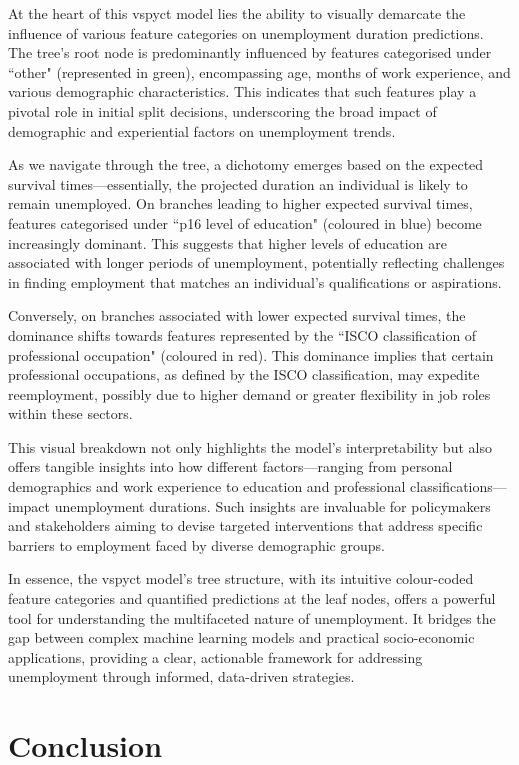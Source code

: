 \documentclass[3p,review,authoryear]{elsarticle}
\begin{document}
At the heart of this \gls{vspyct} model lies the ability to visually demarcate the influence of various feature categories on unemployment duration predictions.
The tree's root node is predominantly influenced by features categorised under ``other" (represented in green), encompassing age, months of work experience, and various demographic characteristics.
This indicates that such features play a pivotal role in initial split decisions, underscoring the broad impact of demographic and experiential factors on unemployment trends.

As we navigate through the tree, a dichotomy emerges based on the expected survival times—essentially, the projected duration an individual is likely to remain unemployed.
On branches leading to higher expected survival times, features categorised under ``p16 level of education" (coloured in blue) become increasingly dominant.
This suggests that higher levels of education are associated with longer periods of unemployment, potentially reflecting challenges in finding employment that matches an individual's qualifications or aspirations.

Conversely, on branches associated with lower expected survival times, the dominance shifts towards features represented by the ``ISCO classification of professional occupation" (coloured in red).
This dominance implies that certain professional occupations, as defined by the ISCO classification, may expedite reemployment, possibly due to higher demand or greater flexibility in job roles within these sectors.

This visual breakdown not only highlights the model's interpretability but also offers tangible insights into how different factors—ranging from personal demographics and work experience to education and professional classifications—impact unemployment durations.
Such insights are invaluable for policymakers and stakeholders aiming to devise targeted interventions that address specific barriers to employment faced by diverse demographic groups.

In essence, the \gls{vspyct} model's tree structure, with its intuitive colour-coded feature categories and quantified predictions at the leaf nodes, offers a powerful tool for understanding the multifaceted nature of unemployment.
It bridges the gap between complex machine learning models and practical socio-economic applications, providing a clear, actionable framework for addressing unemployment through informed, data-driven strategies.


\section{Conclusion}
\end{document}
